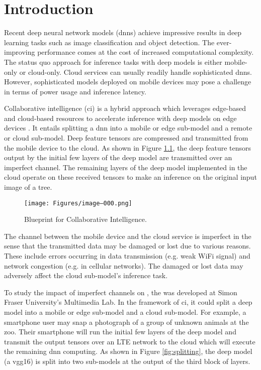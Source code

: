 \chapter{Introduction} \label{chapter:intro}
Recent deep neural network models (\gls{dnn}s) achieve impressive results in deep learning tasks such as image classification and object detection. The ever-improving performance comes at the cost of increased computational complexity. The status quo approach for inference tasks with deep models is either mobile-only or cloud-only. Cloud services can usually readily handle sophisticated \gls{dnn}s. However, sophisticated models deployed on mobile devices may pose a challenge in terms of power usage and inference latency. 

Collaborative intelligence (\gls{ci}) is a hybrid approach which leverages edge-based and cloud-based resources to accelerate inference with deep models on edge devices \cite{neurosurgeon,jointdnn,8451100,8803110,choi2018deep,alvar2020bit,9017944}. It entails splitting a \gls{dnn} into a mobile or edge sub-model and a remote or cloud sub-model. Deep feature tensors are compressed and transmitted from the mobile device to the cloud. As shown in Figure \ref{fig:ci}, the deep feature tensors output by the initial few layers of the deep model are transmitted over an imperfect channel. The remaining layers of the deep model implemented in the cloud operate on these received tensors to make an inference on the original input image of a tree.

\begin{figure}[H]
	\centering
	\texttt{[image: Figures/image--000.png]}
	\caption{Blueprint for Collaborative Intelligence.\cite{neurosurgeon}}
	\label{fig:ci}
\end{figure}

The channel between the mobile device and the cloud service is imperfect in the sense that the transmitted data may be damaged or lost due to various reasons. These include errors occurring in data transmission (e.g. weak WiFi signal) and network congestion (e.g. in cellular networks). The damaged or lost data may adversely affect the cloud sub-model's inference task. 

To study the impact of imperfect channels on , the  was developed at Simon Fraser University's Multimedia Lab. In the framework of \gls{ci}, it could split a deep model into a mobile or edge sub-model and a cloud sub-model. For example, a smartphone user may snap a photograph of a group of unknown animals at the zoo. Their smartphone will run the initial few layers of the deep model and transmit the output tensors over an LTE network to the cloud which will execute the remaining \gls{dnn} computing. As shown in Figure \ref{fig:splitting}, the deep model (a \gls{vgg16}) is split into two sub-models at the output of the third block of layers.

